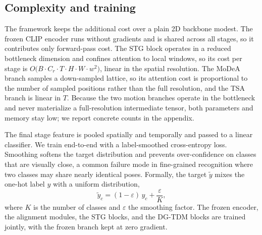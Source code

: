 \subsection{Complexity and training}
\label{sec:complexity}

The framework keeps the additional cost over a plain 2D backbone modest. The
frozen CLIP encoder runs without gradients and is shared across all stages,
so it contributes only forward-pass cost. The STG block operates in a reduced
bottleneck dimension
and confines attention to local windows, so its cost per stage is
$O\big(B \cdot C_r \cdot T \cdot H \cdot W \cdot w^2\big)$, linear in the
spatial resolution. The MoDeA branch samples a down-sampled lattice, so its
attention cost is proportional to the number of sampled positions rather than
the full resolution, and the TSA branch is linear in $T$. Because the two
motion branches operate in the bottleneck and never materialize a
full-resolution intermediate tensor, both parameters and memory stay low; we
report concrete counts in the appendix.

The final stage feature is pooled spatially and temporally and passed to a
linear classifier. We train end-to-end with a label-smoothed cross-entropy
loss. Smoothing softens the target distribution and prevents over-confidence on
classes that are visually close, a common failure mode in fine-grained
recognition where two classes may share nearly identical poses. Formally, the
target $\tilde{y}$ mixes the one-hot label $y$ with a uniform distribution,
\begin{equation}
  \tilde{y}_c = (1 - \varepsilon)\, y_c + \frac{\varepsilon}{K},
\end{equation}
where $K$ is the number of classes and $\varepsilon$ the smoothing factor. The
frozen encoder, the alignment modules, the STG blocks, and the DG-TDM blocks
are trained jointly, with the frozen branch kept at zero gradient.

